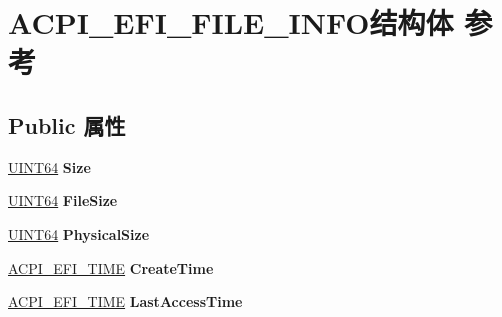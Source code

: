 \hypertarget{struct_a_c_p_i___e_f_i___f_i_l_e___i_n_f_o}{}\section{A\+C\+P\+I\+\_\+\+E\+F\+I\+\_\+\+F\+I\+L\+E\+\_\+\+I\+N\+F\+O结构体 参考}
\label{struct_a_c_p_i___e_f_i___f_i_l_e___i_n_f_o}
\subsection*{Public 属性}
\begin{DoxyCompactItemize}
\item 
\mbox{\label{struct_a_c_p_i___e_f_i___f_i_l_e___i_n_f_o_aa035f0ff2231fb9102d38187612320cd}} 
\hyperlink{_processor_bind_8h_a57be03562867144161c1bfee95ca8f7c}{U\+I\+N\+T64} {\bfseries Size}
\item 
\mbox{\label{struct_a_c_p_i___e_f_i___f_i_l_e___i_n_f_o_aade9b55531f6c6dfb4a3f6ed3d46fe10}} 
\hyperlink{_processor_bind_8h_a57be03562867144161c1bfee95ca8f7c}{U\+I\+N\+T64} {\bfseries File\+Size}
\item 
\mbox{\label{struct_a_c_p_i___e_f_i___f_i_l_e___i_n_f_o_a74b2d28a9551d9ef48f10af7f79c0417}} 
\hyperlink{_processor_bind_8h_a57be03562867144161c1bfee95ca8f7c}{U\+I\+N\+T64} {\bfseries Physical\+Size}
\item 
\mbox{\label{struct_a_c_p_i___e_f_i___f_i_l_e___i_n_f_o_ad9a1a1f3dc6620bd0e4416e0e13b7bac}} 
\hyperlink{struct_a_c_p_i___e_f_i___t_i_m_e}{A\+C\+P\+I\+\_\+\+E\+F\+I\+\_\+\+T\+I\+ME} {\bfseries Create\+Time}
\item 
\mbox{\label{struct_a_c_p_i___e_f_i___f_i_l_e___i_n_f_o_ad5a8146142141abc065d45e8fadd9340}} 
\hyperlink{struct_a_c_p_i___e_f_i___t_i_m_e}{A\+C\+P\+I\+\_\+\+E\+F\+I\+\_\+\+T\+I\+ME} {\bfseries Last\+Access\+Time}
\item 
\mbox{\label{struct_a_c_p_i___e_f_i___f_i_l_e___i_n_f_o_afc92404d6515a8a4d98702f5e29e9686}} 

\end{DoxyCompactItemize}

